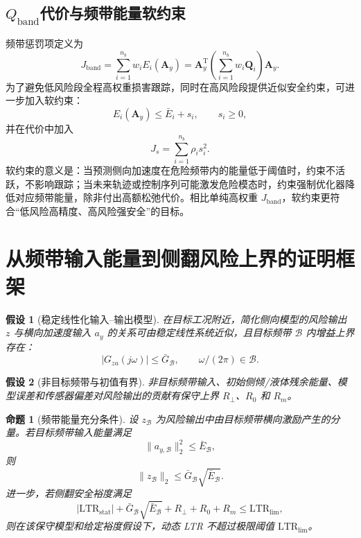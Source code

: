 \documentclass[UTF8,zihao=-4]{ctexrep}
\newcommand{\Qband}{$Q_{\mathrm{band}}$}
\newcommand{\ay}{a_y}
\newcommand{\LTR}{\mathrm{LTR}}
\newcommand{\T}{\mathrm{T}}
\newtheorem{assumption}{假设}
\newtheorem{proposition}{命题}
\begin{document}
\subsection{\Qband 代价与频带能量软约束}
频带惩罚项定义为
\begin{equation}
    J_{\mathrm{band}}=\sum_{i=1}^{n_b}w_i E_i(\bm A_y)=\bm A_y^{\T}\left(\sum_{i=1}^{n_b}w_i\bm Q_i\right)\bm A_y.
\end{equation}
为了避免低风险段全程高权重损害跟踪，同时在高风险段提供近似安全约束，可进一步加入软约束：
\begin{equation}
    E_i(\bm A_y)\leq \bar E_i+s_i,
    \qquad s_i\geq 0,
    \label{eq:soft_band_constraint}
\end{equation}
并在代价中加入
\begin{equation}
    J_s=\sum_{i=1}^{n_b}\rho_i s_i^2.
\end{equation}
软约束的意义是：当预测侧向加速度在危险频带内的能量低于阈值时，约束不活跃，不影响跟踪；当未来轨迹或控制序列可能激发危险模态时，约束强制优化器降低对应频带能量，除非付出高额松弛代价。相比单纯高权重 $J_{\mathrm{band}}$，软约束更符合“低风险高精度、高风险强安全”的目标。

\section{从频带输入能量到侧翻风险上界的证明框架}
\begin{assumption}[稳定线性化输入--输出模型]
在目标工况附近，简化侧向模型的风险输出 $z$ 与横向加速度输入 $\ay$ 的关系可由稳定线性系统近似，且目标频带 $\mathcal B$ 内增益上界存在：
\begin{equation}
    |G_{za}(j\omega)|\leq \bar G_{\mathcal B},\qquad \omega/(2\pi)\in\mathcal B.
\end{equation}
\end{assumption}

\begin{assumption}[非目标频带与初值有界]
非目标频带输入、初始侧倾/液体残余能量、模型误差和传感器偏差对风险输出的贡献有保守上界 $R_\perp$、$R_0$ 和 $R_m$。
\end{assumption}

\begin{proposition}[频带能量充分条件]
设 $z_{\mathcal B}$ 为风险输出中由目标频带横向激励产生的分量。若目标频带输入能量满足
\begin{equation}
    \|a_{y,\mathcal B}\|_2^2\leq \bar E_{\mathcal B},
\end{equation}
则
\begin{equation}
    \|z_{\mathcal B}\|_2\leq \bar G_{\mathcal B}\sqrt{\bar E_{\mathcal B}}.
\end{equation}
进一步，若侧翻安全裕度满足
\begin{equation}
    |\LTR_{\mathrm{stat}}|+\bar G_{\mathcal B}\sqrt{\bar E_{\mathcal B}}+R_\perp+R_0+R_m\leq \LTR_{\lim},
    \label{eq:ltr_margin_condition}
\end{equation}
则在该保守模型和给定裕度假设下，动态 LTR 不超过极限阈值 $\LTR_{\lim}$。
\end{proposition}
\end{document}
